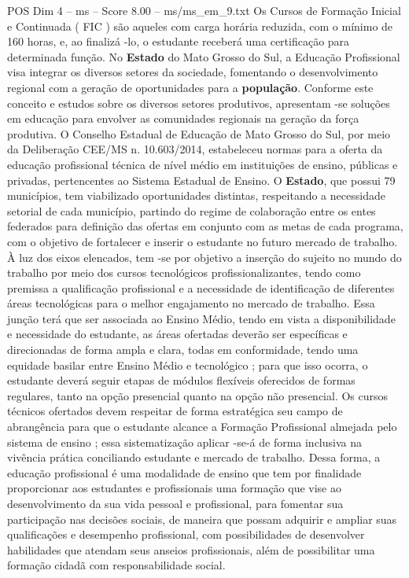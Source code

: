 \begin{textsample}{POS Dim 4 – ms – Score 8.00 – ms/ms\_em\_9.txt}
Os Cursos de Formação Inicial e Continuada ( FIC ) são aqueles com carga horária reduzida, com o mínimo de 160 horas, e, ao finalizá -lo, o estudante receberá uma certificação para determinada função.
No \textbf{Estado} do Mato Grosso do Sul, a Educação Profissional visa integrar os diversos setores da sociedade, fomentando o desenvolvimento regional com a geração de oportunidades para a \textbf{população}.
Conforme este conceito e estudos sobre os diversos setores produtivos, apresentam -se soluções em educação para envolver as comunidades regionais na geração da força produtiva.
O Conselho Estadual de Educação de Mato Grosso do Sul, por meio da Deliberação CEE/MS n. 10.603/2014, estabeleceu normas para a oferta da educação profissional técnica de nível médio em instituições de ensino, públicas e privadas, pertencentes ao Sistema Estadual de Ensino.
O \textbf{Estado}, que possui 79 municípios, tem viabilizado oportunidades distintas, respeitando a necessidade setorial de cada município, partindo do regime de colaboração entre os entes federados para definição das ofertas em conjunto com as metas de cada programa, com o objetivo de fortalecer e inserir o estudante no futuro mercado de trabalho.
À luz dos eixos elencados, tem -se por objetivo a inserção do sujeito no mundo do trabalho por meio dos cursos tecnológicos profissionalizantes, tendo como premissa a qualificação profissional e a necessidade de identificação de diferentes áreas tecnológicas para o melhor engajamento no mercado de trabalho.
Essa junção terá que ser associada ao Ensino Médio, tendo em vista a disponibilidade e necessidade do estudante, as áreas ofertadas deverão ser específicas e direcionadas de forma ampla e clara, todas em conformidade, tendo uma equidade basilar entre Ensino Médio e tecnológico ; para que isso ocorra, o estudante deverá seguir etapas de módulos flexíveis oferecidos de formas regulares, tanto na opção presencial quanto na opção não presencial.
Os cursos técnicos ofertados devem respeitar de forma estratégica seu campo de abrangência para que o estudante alcance a Formação Profissional almejada pelo sistema de ensino ; essa sistematização aplicar -se-á de forma inclusiva na vivência prática conciliando estudante e mercado de trabalho.
Dessa forma, a educação profissional é uma modalidade de ensino que tem por finalidade proporcionar aos estudantes e profissionais uma formação que vise ao desenvolvimento da sua vida pessoal e profissional, para fomentar sua participação nas decisões sociais, de maneira que possam adquirir e ampliar suas qualificações e desempenho profissional, com possibilidades de desenvolver habilidades que atendam seus anseios profissionais, além de possibilitar uma formação cidadã com responsabilidade social.

\end{textsample}

